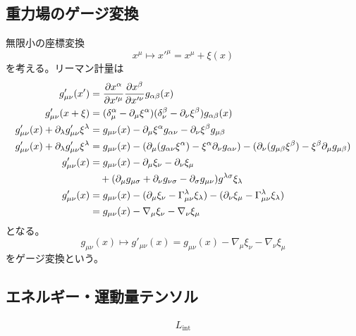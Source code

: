 \subsection{重力場のゲージ変換}
    無限小の座標変換
        \[x^\mu \mapsto x'^\mu = x^\mu + \xi(x)\]
    を考える。リーマン計量は
    \begin{align*}
        g'_{\mu\nu}(x') &= \pdv{x^\alpha}{x'^\mu}\pdv{x^\beta}{x'^\nu}g_{\alpha\beta}(x)\\
        g'_{\mu\nu}(x + \xi) &= (\delta_\mu^\alpha - \partial_\mu \xi^\alpha)(\delta_\nu^\beta - \partial_\nu \xi^\beta)g_{\alpha\beta}(x)\\
        g'_{\mu\nu}(x) + \partial_\lambda g'_{\mu\nu}\xi^\lambda &= g_{\mu\nu}(x) - \partial_\mu \xi^\alpha g_{\alpha\nu} - \partial_\nu \xi^\beta g_{\mu\beta}\\
        g'_{\mu\nu}(x) + \partial_\lambda g'_{\mu\nu}\xi^\lambda &= g_{\mu\nu}(x) - (\partial_\mu(g_{\alpha\nu}\xi^\alpha) - \xi^\alpha \partial_\nu g_{\alpha\nu}) - (\partial_\nu(g_{\mu\beta}\xi^\beta) - \xi^\beta \partial_\mu g_{\mu\beta})\\
        g'_{\mu\nu}(x) &= g_{\mu\nu}(x) - \partial_\mu \xi_\nu - \partial_\nu \xi_\mu\\
            &\quad + (\partial_\mu g_{\mu\sigma} + \partial_\nu g_{\nu\sigma} - \partial_\sigma g_{\mu\nu})g^{\lambda\sigma}\xi_\lambda\\
        g'_{\mu\nu}(x) &= g_{\mu\nu}(x) - (\partial_\mu\xi_\nu - \Gamma^\lambda_{\mu\nu}\xi_\lambda) - (\partial_\nu\xi_\mu - \Gamma^\lambda_{\mu\nu}\xi_\lambda)\\
            &= g_{\mu\nu}(x) - \nabla_\mu\xi_\nu - \nabla_\nu\xi_\mu
    \end{align*}
    となる。
        \[g_{\mu\nu}(x) \mapsto g'_{\mu\nu}(x) = g_{\mu\nu}(x) - \nabla_\mu\xi_\nu - \nabla_\nu\xi_\mu\]
    をゲージ変換という。



\subsection{エネルギー・運動量テンソル}
    \begin{align*}
        L_\text{int}
    \end{align*}